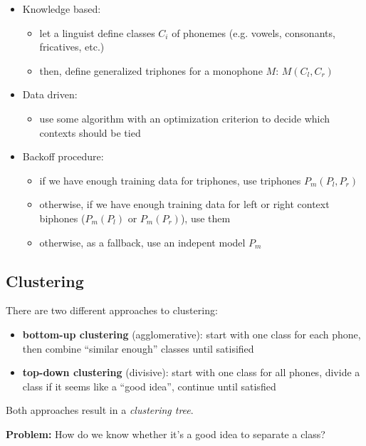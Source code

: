 \documentclass[11pt]{article}
\begin{document}
\begin{itemize}
    \item Knowledge based:
        \begin{itemize}
            \item let a linguist define classes $C_i$ of phonemes (e.g. vowels, consonants, fricatives, etc.)
            \item then, define generalized triphones for a monophone $M$: $M(C_l, C_r)$
        \end{itemize}
    \item Data driven:
        \begin{itemize}
            \item use some algorithm with an optimization criterion to decide which contexts should be tied
        \end{itemize}
    \item Backoff procedure:
        \begin{itemize}
            \item if we have enough training data for triphones, use triphones $P_m(P_l, P_r)$
            \item otherwise, if we have enough training data for left or right context biphones ($P_m(P_l)$ or $P_m(P_r)$), use them
            \item otherwise, as a fallback, use an indepent model $P_m$
        \end{itemize}
\end{itemize}

\subsection{Clustering}

There are two different approaches to clustering:
\begin{itemize}
    \item \textbf{bottom-up clustering} (agglomerative): start with one class for each phone, then combine ``similar enough'' classes until satisified
    \item \textbf{top-down clustering} (divisive): start with one class for all phones, divide a class if it seems like a ``good idea'', continue until satisfied
\end{itemize}

Both approaches result in a \textit{clustering tree}.

\vspace{10pt}
\textbf{Problem:} How do we know whether it's a good idea to separate a class? 
\end{document}
